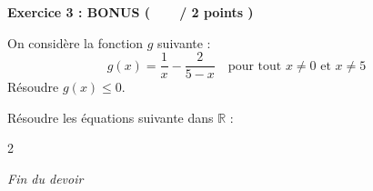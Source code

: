 \documentclass[12pt,a4paper]{exam}
\begin{document}
\vspace{10pt}

\noindent
\textbf{Exercice 3 : BONUS (\ \ \ \  / 2 points )}
\vspace{5pt}

\begin{questions}

\question[1] On considère la fonction $g$ suivante :
\[
g(x) = \dfrac{1}{x} - \dfrac{2}{5-x} \quad \text{pour tout $x \neq 0$ et $x \neq 5$}
\]
Résoudre $g(x) \leq 0$.

\vspace{5pt}

\question[1] Résoudre les équations suivante dans $\mathbb{R}$ :
\begin{multicols}{2}
\end{multicols}

\end{questions}

\vspace{10pt}

\begin{center}
    \textit{Fin du devoir}
\end{center}
\end{document}
